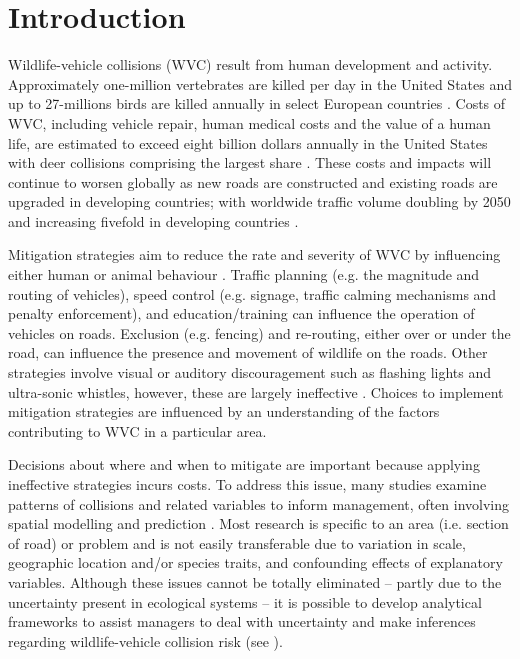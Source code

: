 \newpage
\section{Introduction}

Wildlife-vehicle collisions (WVC) result from human development and activity. Approximately one-million vertebrates are killed per day in the United States \citep{form98} and up to 27-millions birds are killed annually in select European countries \citep{erri03}.  Costs of WVC, including vehicle repair, human medical costs and the value of a human life, are estimated to exceed eight billion dollars annually in the United States \citep{huij07b} with deer collisions comprising the largest share \citep[see][]{biss08b}.  These costs and impacts will continue to worsen globally as new roads are constructed and existing roads are upgraded in developing countries; with worldwide traffic volume doubling by 2050 and increasing fivefold in developing countries \citep{rvdr15}.

Mitigation strategies aim to reduce the rate and severity of WVC by influencing either human or animal behaviour \citep[see][]{huij10}.  Traffic planning (e.g. the magnitude and routing of vehicles), speed control (e.g. signage, traffic calming mechanisms and penalty enforcement), and education/training can influence the operation of vehicles on roads.  Exclusion (e.g. fencing) and re-routing, either over or under the road, can influence the presence and movement of wildlife on the roads.  Other strategies involve visual or auditory discouragement such as flashing lights and ultra-sonic whistles, however, these are largely ineffective \citep{reev93,bend03,sche03,ramp06c}. Choices to implement mitigation strategies are influenced by an understanding of the factors contributing to WVC in a particular area.

Decisions about where and when to mitigate are important because applying ineffective strategies incurs costs.  To address this issue, many studies examine patterns of collisions and related variables to inform management, often involving spatial modelling and prediction \citep[see][]{guns11}.  Most research is specific to an area (i.e. section of road) or problem and is not easily transferable due to variation in scale, geographic location and/or species traits, and confounding effects of explanatory variables.  Although these issues cannot be totally eliminated -- partly due to the uncertainty present in ecological systems -- it is possible to develop analytical frameworks to assist managers to deal with uncertainty and make inferences regarding wildlife-vehicle collision risk (see ).

